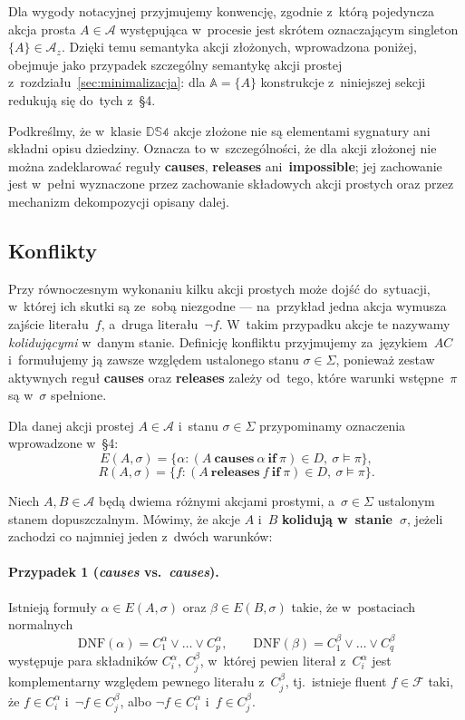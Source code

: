\documentclass[11pt,a4paper]{article}
\newif\ifshowbib
\newcommand{\bibonly}[1]{\ifshowbib#1\fi}
\renewcommand{\cite}[2][]{\unskip}%
\newcommand{\causes}{\textbf{causes}}
\renewcommand{\iff}{\textbf{if}}
\newcommand{\impossible}{\textbf{impossible}}
\newcommand{\releases}{\textbf{releases}}
\newcommand{\DNF}{\mathrm{DNF}}
\theoremstyle{definition}
\begin{document}
Dla wygody notacyjnej przyjmujemy konwencję, zgodnie z~którą pojedyncza
akcja prosta $A \in \mathcal{A}$ występująca w~procesie jest skrótem
oznaczającym singleton $\{A\} \in \mathcal{A}_z$. Dzięki temu semantyka
akcji złożonych, wprowadzona poniżej, obejmuje jako przypadek szczególny
semantykę akcji prostej z~rozdziału~\ref{sec:minimalizacja}: dla
$\mathbb{A} = \{A\}$ konstrukcje z~niniejszej sekcji redukują się do~tych
z~\S4.

Podkreślmy, że w~klasie $\mathbb{DS4}$ akcje złożone nie są elementami
sygnatury ani składni opisu dziedziny. Oznacza to w~szczególności, że
dla akcji złożonej nie można zadeklarować reguły \causes{}, \releases{}
ani~\impossible{}; jej zachowanie jest w~pełni wyznaczone przez
zachowanie składowych akcji prostych oraz przez mechanizm dekompozycji
opisany dalej.

\subsection{Konflikty}
\label{sec:konflikty}

Przy równoczesnym wykonaniu kilku akcji prostych może dojść do~sytuacji,
w~której ich skutki są ze~sobą niezgodne --- na~przykład jedna akcja
wymusza zajście literału~$f$, a~druga literału~$\neg f$. W~takim
przypadku akcje te nazywamy \emph{kolidującymi} w~danym stanie.
Definicję konfliktu przyjmujemy za~językiem~$AC$\bibonly{~\cite{rw05}}
i~formułujemy ją zawsze względem ustalonego stanu $\sigma \in \Sigma$,
ponieważ zestaw aktywnych reguł \causes{} oraz \releases{} zależy od~tego,
które warunki wstępne~$\pi$ są w~$\sigma$ spełnione.

Dla danej akcji prostej $A \in \mathcal{A}$ i~stanu $\sigma \in \Sigma$
przypominamy oznaczenia wprowadzone w~\S4:
\[
  E(A,\sigma)=\{\alpha : (A\ \causes\ \alpha\ \iff\ \pi)\in D,\ \sigma \models \pi\},
\]
\[
  R(A,\sigma)=\{f : (A\ \releases\ f\ \iff\ \pi)\in D,\ \sigma \models \pi\}.
\]

\noindent Niech $A, B \in \mathcal{A}$ będą dwiema różnymi akcjami prostymi, a~$\sigma \in \Sigma$
ustalonym stanem dopuszczalnym. Mówimy, że akcje $A$ i~$B$
\textbf{kolidują w~stanie~$\sigma$}, jeżeli zachodzi co najmniej jeden
z~dwóch warunków:

\paragraph{Przypadek 1 (\textit{causes} vs.\ \textit{causes}).}
Istnieją formuły $\alpha \in E(A,\sigma)$ oraz $\beta \in E(B,\sigma)$
takie, że w~postaciach normalnych
\[
  \DNF(\alpha) = C_1^\alpha \lor \ldots \lor C_{p}^\alpha,
  \qquad
  \DNF(\beta) = C_1^\beta \lor \ldots \lor C_{q}^\beta
\]
występuje para składników $C_i^\alpha$, $C_j^\beta$, w~której pewien
literał z~$C_i^\alpha$ jest komplementarny względem pewnego literału
z~$C_j^\beta$, tj.\ istnieje fluent $f \in \mathcal{F}$ taki, że
$f \in C_i^\alpha$ i~$\neg f \in C_j^\beta$, albo $\neg f \in C_i^\alpha$
i~$f \in C_j^\beta$.
\end{document}
